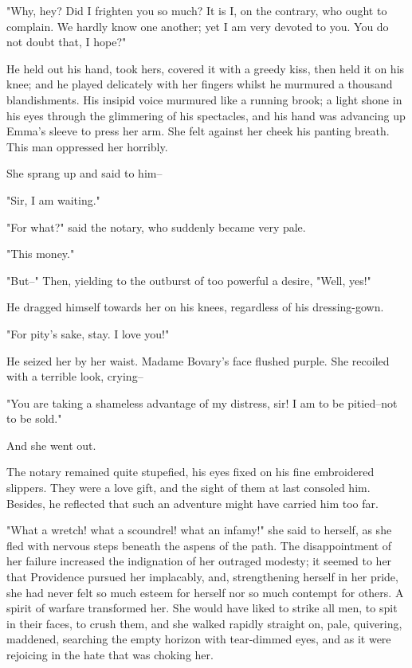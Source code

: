 \documentclass{tufte-book}
\begin{document}
"Why, hey? Did I frighten you so much? It is I, on the contrary, who
ought to complain. We hardly know one another; yet I am very devoted to
you. You do not doubt that, I hope?"

He held out his hand, took hers, covered it with a greedy kiss, then
held it on his knee; and he played delicately with her fingers whilst
he murmured a thousand blandishments. His insipid voice murmured like a
running brook; a light shone in his eyes through the glimmering of his
spectacles, and his hand was advancing up Emma's sleeve to press her
arm. She felt against her cheek his panting breath. This man oppressed
her horribly.

She sprang up and said to him--

"Sir, I am waiting."

"For what?" said the notary, who suddenly became very pale.

"This money."

"But--" Then, yielding to the outburst of too powerful a desire, "Well,
yes!"

He dragged himself towards her on his knees, regardless of his
dressing-gown.

"For pity's sake, stay. I love you!"

He seized her by her waist. Madame Bovary's face flushed purple. She
recoiled with a terrible look, crying--

"You are taking a shameless advantage of my distress, sir! I am to be
pitied--not to be sold."

And she went out.

The notary remained quite stupefied, his eyes fixed on his fine
embroidered slippers. They were a love gift, and the sight of them at
last consoled him. Besides, he reflected that such an adventure might
have carried him too far.

"What a wretch! what a scoundrel! what an infamy!" she said to herself,
as she fled with nervous steps beneath the aspens of the path. The
disappointment of her failure increased the indignation of her outraged
modesty; it seemed to her that Providence pursued her implacably, and,
strengthening herself in her pride, she had never felt so much esteem
for herself nor so much contempt for others. A spirit of warfare
transformed her. She would have liked to strike all men, to spit in
their faces, to crush them, and she walked rapidly straight on, pale,
quivering, maddened, searching the empty horizon with tear-dimmed eyes,
and as it were rejoicing in the hate that was choking her.
\end{document}

